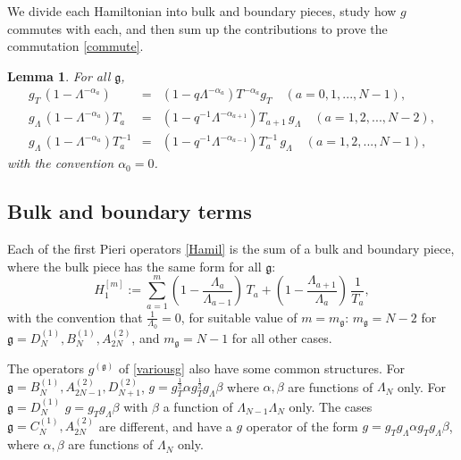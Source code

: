 \documentclass[12pt]{amsart}
\newtheorem{lemma}[thm]{Lemma}
\newcommand{\g}{{\mathfrak{g}}}
\newcommand{\al}{{\alpha}}
\newcommand{\lL}{{\Lambda}}
\numberwithin{equation}{section}
\begin{document}
We divide each Hamiltonian into bulk and boundary pieces, study how $g$ commutes with each,
and then sum up the contributions to prove the commutation \eqref{commute}.


\begin{lemma}
For all $\g$, 
\begin{eqnarray}
g_T\, \left(1-\lL^{-\al_a}\right) &=&   \left(1-q \lL^{-\al_a}\right) T^{-\al_a} g_T \quad (a=0,1,...,N-1),\label{lemc1}\\
g_\lL\,  \left(1-\lL^{-\al_a}\right) T_a&=& \left(1-q^{-1}\lL^{-\al_{a+1}}\right) T_{a+1}\, g_\lL \quad (a=1,2,...,N-2),\label{lemc2}\\
g_\lL\, \left(1-\lL^{-\al_a}\right) T_a^{-1}&=& \left(1-q^{-1}\lL^{-\al_{a-1}}\right)T_a^{-1}\, g_\lL\quad (a=1,2,...,N-1) ,\label{lemc3}
\end{eqnarray}
with the convention $\al_0=0$.
%
%
%
%
%
\end{lemma}
%
%
%

%
%
%
%
%
%
%
%
%
%

\subsection{Bulk and boundary terms}
Each of the first Pieri  operators \eqref{Hamil} is the sum of a bulk and  boundary piece, where the bulk piece has the same form for all $\g$:
$$H_1^{[m]}:=\sum_{a=1}^m \left(1-\frac{\lL_a}{\lL_{a-1}}\right)\, T_a+\left(1-\frac{\lL_{a+1}}{\lL_{a}}\right)\, \frac{1}{T_a},$$
with the convention that $\frac{1}{\lL_0}=0$, for suitable value of $m= m_\g$: $m_\g=N-2$ for $\g=D_N^{(1)},B_N^{(1)},A_{2N}^{(2)}$, and $m_\g=N-1$ for all other cases. 

The operators $g^{(\g)}$ of \eqref{variousg} also have some common structures. For 
$\g=B_N^{(1)},A_{2N-1}^{(2)},D_{N+1}^{(2)}$, 
$g=g_T^{\frac{1}{2}} \al g_T^{\frac{1}{2}} g_\lL \beta $ where $\al,\beta$ are functions of $\lL_N$ only. For
$\g=D_N^{(1)}$  $g=g_T g_\lL \beta$ with $\beta$  a function of $\lL_{N-1}\lL_N$ only. 
The cases $\g=C_N^{(1)},A_{2N}^{(2)}$ are different, and have a $g$ operator of the form $g=g_Tg_\lL \al g_Tg_\lL\beta$, where $\al,\beta$ are functions of $\lL_N$ only.
\end{document}
